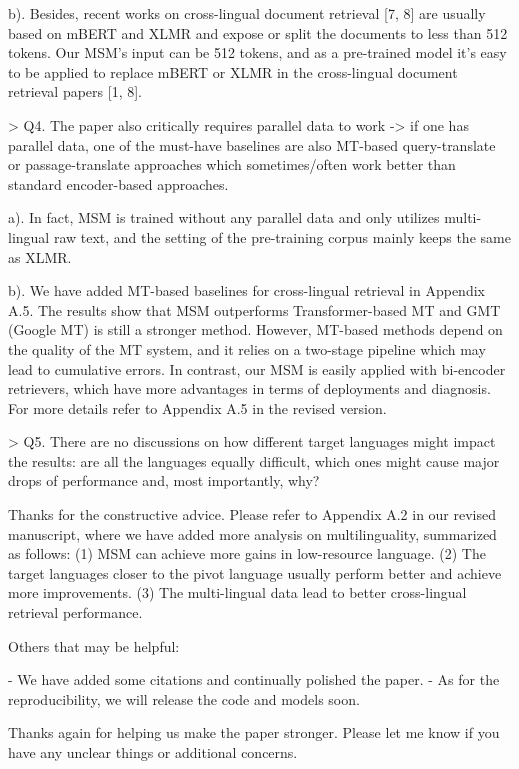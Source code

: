 b). Besides, recent works on cross-lingual document retrieval [7, 8] are usually based on mBERT and XLMR and expose or split the documents to less than 512 tokens. Our MSM's input can be 512 tokens, and as a pre-trained model it's easy to be applied to replace mBERT or XLMR in the cross-lingual document retrieval papers [1, 8].  



> Q4. The paper also critically requires parallel data to work -> if one has parallel data, one of the must-have baselines are also MT-based query-translate or passage-translate approaches which sometimes/often work better than standard encoder-based approaches.

a). In fact, MSM is trained without any parallel data and only utilizes multi-lingual raw text, and the setting of the pre-training corpus mainly keeps the same as XLMR.

b). We have added MT-based baselines for cross-lingual retrieval in Appendix A.5. The results show that MSM outperforms Transformer-based MT and GMT (Google MT) is still a stronger method. However, MT-based methods depend on the quality of the MT system, and it relies on a two-stage pipeline which may lead to cumulative errors. In contrast, our MSM is easily applied with bi-encoder retrievers, which have more advantages in terms of deployments and diagnosis. For more details refer to Appendix A.5 in the revised version.



> Q5. There are no discussions on how different target languages might impact the results: are all the languages equally difficult, which ones might cause major drops of performance and, most importantly, why? 

Thanks for the constructive advice. Please refer to Appendix A.2 in our revised manuscript, where we have added more analysis on multilinguality, summarized as follows: (1) MSM can achieve more gains in low-resource language. (2) The target languages closer to the pivot language usually perform better and achieve more improvements. (3) The multi-lingual data lead to better cross-lingual retrieval performance. 



Others that may be helpful:

- We have added some citations and continually polished the paper.
- As for the reproducibility, we will release the code and models soon. 

Thanks again for helping us make the paper stronger. Please let me know if you have any unclear things or additional concerns.



